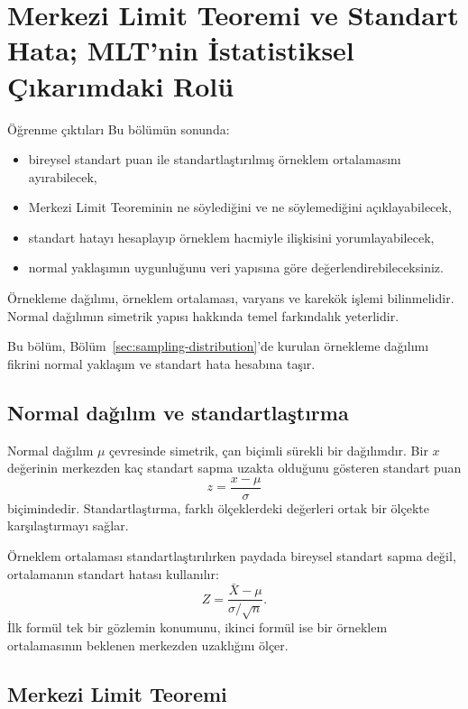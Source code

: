 \chapter[Merkezi Limit Teoremi ve Standart Hata]{Merkezi Limit Teoremi ve Standart Hata; MLT'nin İstatistiksel Çıkarımdaki Rolü}
\label{ch:clt-se}

\begin{prismbox}[PrismLight]{Öğrenme çıktıları}
Bu bölümün sonunda:
\begin{itemize}
  \item bireysel standart puan ile standartlaştırılmış örneklem ortalamasını ayırabilecek,
  \item Merkezi Limit Teoreminin ne söylediğini ve ne söylemediğini açıklayabilecek,
  \item standart hatayı hesaplayıp örneklem hacmiyle ilişkisini yorumlayabilecek,
  \item normal yaklaşımın uygunluğunu veri yapısına göre değerlendirebileceksiniz.
\end{itemize}
\end{prismbox}

\begin{prerequisitebox}
Örnekleme dağılımı, örneklem ortalaması, varyans ve karekök işlemi
bilinmelidir. Normal dağılımın simetrik yapısı hakkında temel farkındalık
yeterlidir.
\end{prerequisitebox}

Bu bölüm, Bölüm~\ref{sec:sampling-distribution}'de kurulan örnekleme dağılımı
fikrini normal yaklaşım ve standart hata hesabına taşır.

\section{Normal dağılım ve standartlaştırma}

Normal dağılım $\mu$ çevresinde simetrik, çan biçimli sürekli bir dağılımdır.
Bir $x$ değerinin merkezden kaç standart sapma uzakta olduğunu gösteren
standart puan
\[
z=\frac{x-\mu}{\sigma}
\]
biçimindedir. Standartlaştırma, farklı ölçeklerdeki değerleri ortak bir
ölçekte karşılaştırmayı sağlar.

Örneklem ortalaması standartlaştırılırken paydada bireysel standart sapma
değil, ortalamanın standart hatası kullanılır:
\[
Z=\frac{\bar X-\mu}{\sigma/\sqrt n}.
\]
İlk formül tek bir gözlemin konumunu, ikinci formül ise bir örneklem
ortalamasının beklenen merkezden uzaklığını ölçer.

\section{Merkezi Limit Teoremi}
\label{sec:clt}

